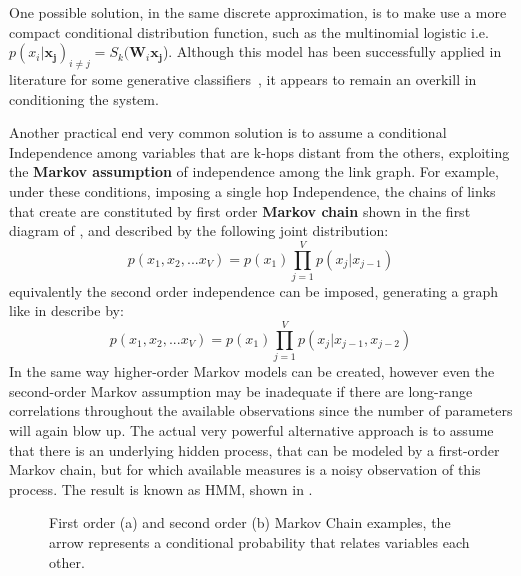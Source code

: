 One possible solution, in the same discrete approximation, is to make use a more compact conditional distribution function, such as the multinomial logistic i.e. $p(x_i | \bm{x_j})_{i \neq j} = S_k(\bm{W}_i \bm{x_{j}}$). Although this model has been successfully applied in literature for some generative classifiers~\cite{Bengio:1999:MHD:3009657.3009714}, it appears to remain an overkill in conditioning the system.

Another practical end very common solution is to assume a conditional Independence among variables that are k-hops distant from the others, exploiting the \textbf{Markov assumption} of independence among the link graph.
For example, under these conditions, imposing a single hop Independence, the chains of links that create are constituted by first order \textbf{Markov chain} shown in the first diagram of \Figure{\ref{fig:simple_markov_chains_a}}, and described by the following joint distribution:
\begin{equation}
    p(x_1, x_2, ... x_V) = p(x_1) \prod_{j=1}^V p(x_j|x_{j-1})
\end{equation}
equivalently the second order independence can be imposed, generating a graph like in \Figure{\ref{fig:simple_markov_chains_b}} describe by:
\begin{equation}
    p(x_1, x_2, ... x_V) = p(x_1) \prod_{j=1}^V p(x_j|x_{j-1},x_{j-2})
\end{equation}
In the same way higher-order Markov models can be created, however even the second-order Markov assumption may be inadequate if there are long-range correlations throughout the available observations since the number of parameters will again blow up. The actual very powerful alternative approach is to assume that there is an underlying hidden process, that can be modeled by a first-order Markov chain, but for which available measures is a noisy observation of this process. The result is known as \acl{HMM}, shown in \Figure{\ref{fig:hidden_markov}}. 


\begin{figure}
    \centering
    \caption{First order (a) and second order (b) Markov Chain examples, the arrow represents a conditional probability that relates variables each other.}
    \label{fig:simple_markov_chains}
\end{figure}

